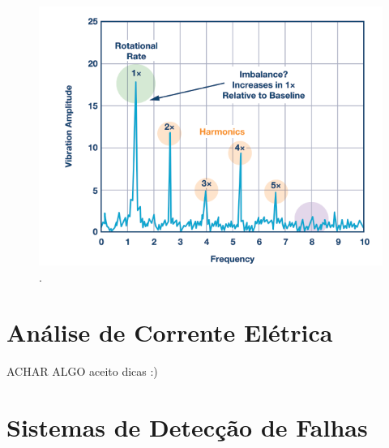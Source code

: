 \begin{figure}[H]
    \caption{.}
    \begin{center}
        \includegraphics[scale=.5]{referencial/img/imbalance_analog_p2.png}
    \end{center}
    \label{fig:}
\end{figure}



% 

\section{Análise de Corrente Elétrica }\label{sec:}

ACHAR ALGO
aceito dicas :)





% 

\section{Sistemas de Detecção de Falhas}\label{sec:}

